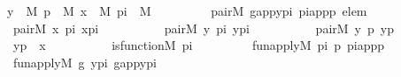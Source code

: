 \begin{isabellebody}
\ \ \ \ \ \ \ {\isasymexists}y\ {\isasymin}\ M{\isachardot}{\kern0pt}\ {\isasymexists}p\ {\isasymin}\ M{\isachardot}{\kern0pt}\ {\isasymexists}x\ {\isasymin}\ M{\isachardot}{\kern0pt}\ {\isasymexists}pi\ {\isasymin}\ M{\isachardot}{\kern0pt}\ \isanewline
\ \ \ \ \ \ \ \ pair{\isacharparenleft}{\kern0pt}{\isacharhash}{\kern0pt}{\isacharhash}{\kern0pt}M{\isacharcomma}{\kern0pt}\ g{\isacharunderscore}{\kern0pt}app{\isacharunderscore}{\kern0pt}y{\isacharunderscore}{\kern0pt}pi{\isacharcomma}{\kern0pt}\ pi{\isacharunderscore}{\kern0pt}app{\isacharunderscore}{\kern0pt}p{\isacharcomma}{\kern0pt}\ elem{\isacharparenright}{\kern0pt}\ {\isasymand}\ \isanewline
\ \ \ \ \ \ \ \ pair{\isacharparenleft}{\kern0pt}{\isacharhash}{\kern0pt}{\isacharhash}{\kern0pt}M{\isacharcomma}{\kern0pt}\ x{\isacharcomma}{\kern0pt}\ pi{\isacharcomma}{\kern0pt}\ x{\isacharunderscore}{\kern0pt}pi{\isacharparenright}{\kern0pt}\ {\isasymand}\ \isanewline
\ \ \ \ \ \ \ \ pair{\isacharparenleft}{\kern0pt}{\isacharhash}{\kern0pt}{\isacharhash}{\kern0pt}M{\isacharcomma}{\kern0pt}\ y{\isacharcomma}{\kern0pt}\ pi{\isacharcomma}{\kern0pt}\ y{\isacharunderscore}{\kern0pt}pi{\isacharparenright}{\kern0pt}\ {\isasymand}\ \isanewline
\ \ \ \ \ \ \ \ pair{\isacharparenleft}{\kern0pt}{\isacharhash}{\kern0pt}{\isacharhash}{\kern0pt}M{\isacharcomma}{\kern0pt}\ y{\isacharcomma}{\kern0pt}\ p{\isacharcomma}{\kern0pt}\ y{\isacharunderscore}{\kern0pt}p{\isacharparenright}{\kern0pt}\ {\isasymand}\ \isanewline
\ \ \ \ \ \ \ \ y{\isacharunderscore}{\kern0pt}p\ {\isasymin}\ x\ {\isasymand}\ \isanewline
\ \ \ \ \ \ \ \ is{\isacharunderscore}{\kern0pt}function{\isacharparenleft}{\kern0pt}{\isacharhash}{\kern0pt}{\isacharhash}{\kern0pt}M{\isacharcomma}{\kern0pt}\ pi{\isacharparenright}{\kern0pt}\ {\isasymand}\isanewline
\ \ \ \ \ \ \ \ fun{\isacharunderscore}{\kern0pt}apply{\isacharparenleft}{\kern0pt}{\isacharhash}{\kern0pt}{\isacharhash}{\kern0pt}M{\isacharcomma}{\kern0pt}\ pi{\isacharcomma}{\kern0pt}\ p{\isacharcomma}{\kern0pt}\ pi{\isacharunderscore}{\kern0pt}app{\isacharunderscore}{\kern0pt}p{\isacharparenright}{\kern0pt}\ {\isasymand}\ \isanewline
\ \ \ \ \ \ \ \ fun{\isacharunderscore}{\kern0pt}apply{\isacharparenleft}{\kern0pt}{\isacharhash}{\kern0pt}{\isacharhash}{\kern0pt}M{\isacharcomma}{\kern0pt}\ g{\isacharcomma}{\kern0pt}\ y{\isacharunderscore}{\kern0pt}pi{\isacharcomma}{\kern0pt}\ g{\isacharunderscore}{\kern0pt}app{\isacharunderscore}{\kern0pt}y{\isacharunderscore}{\kern0pt}pi{\isacharparenright}{\kern0pt}\isanewline
\ \ \ \ \ {\isacharparenright}{\kern0pt}{\isachardoublequoteclose}\isanewline
\isanewline

\end{isabellebody}

